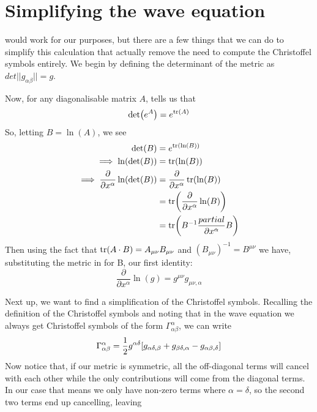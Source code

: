 \documentclass[11pt]{article}
\numberwithin{equation}{section}
\numberwithin{figure}{section}
\numberwithin{table}{section}
\begin{document}
\section{Simplifying the wave equation}\label{sec:simplifying wave equation}
\par {} would work for our purposes, but there are a few things that we can do to simplify this calculation that actually remove the need to compute the Christoffel symbols entirely. We begin by defining the determinant of the metric as $det||g_{\alpha\beta}||=g$. 
\par Now, for any diagonalisable matrix $A$, \cite{determinant thm} tells us that 
\begin{equation}
    \det(e^{A})=e^{\tr(A)}
    \label{eqn:determinant theorem}
\end{equation}
So, letting $B=\ln(A)$, we see
\begin{align*}
    \det(B)&=e^{\tr(\ln(B))}\\
    \implies \ln(\det(B))&=\tr(\ln(B))\\
    \implies \frac{\partial}{\partial x^\alpha}\ln(\det(B))&=\frac{\partial}{\partial x^\alpha}\tr(\ln(B))\\
    &=\tr(\frac{\partial}{\partial x^\alpha}\ln(B))\\
    &=\tr(B^{-1}\frac{partial}{\partial x^\alpha}B)
\end{align*}
Then using the fact that $\tr(A\cdot B)=A_{\mu\nu}B_{\mu\nu}$ and $(B_{\mu\nu})^{-1}=B^{\mu\nu}$ we have, substituting the metric in for B, our first identity:
\begin{equation}
    \frac{\partial}{\partial x^\alpha}\ln(g)=g^{\mu\nu}g_{\mu\nu,\alpha}
    \label{eqn:identity 1}
\end{equation}
\par Next up, we want to find a simplification of the Christoffel symbols. Recalling the definition of the Christoffel symbols and noting that in the wave equation we always get Christoffel symbols of the form $\Gamma^\alpha_{\alpha\beta}$, we can write
\begin{equation*}
    \Gamma^\alpha_{\alpha\beta}=\frac{1}{2}g^{\alpha\delta}[g_{\alpha\delta,\beta}+g_{\beta\delta,\alpha}-g_{\alpha\beta,\delta}]\\
\end{equation*}
Now notice that, if our metric is symmetric, all the off-diagonal terms will cancel with each other while the only contributions will come from the diagonal terms. In our case that means we only have non-zero terms where $\alpha=\delta$, so the second two terms end up cancelling, leaving
\end{document}
